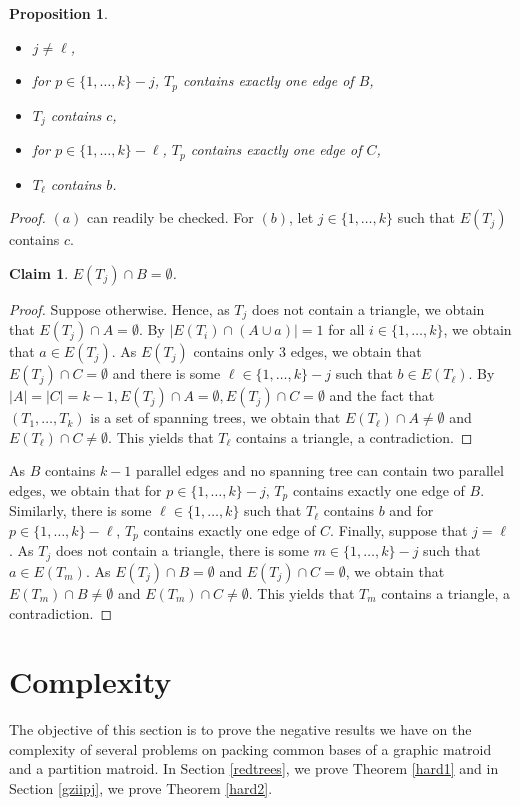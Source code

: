 \documentclass{article}
\newtheorem{Proposition}[Statement]{Proposition}
\newtheorem{Claim}[Statement]{Claim}
\begin{document}
\begin{Proposition}
\begin{enumerate}[(a)]
\end{enumerate} 
\begin{itemize}
\item $j \neq \ell$,
\item for $p \in \{1,\ldots,k\}-j$, $T_p$ contains exactly one edge of $B$,
\item $T_j$ contains $c$,
\item for $p \in \{1,\ldots,k\}-\ell$, $T_p$ contains exactly one edge of $C$,
\item $T_{\ell}$ contains $b$.
\end{itemize}
\end{Proposition}
\begin{proof}
$(a)$ can readily be checked. For $(b)$, let $j \in \{1,\ldots,k\}$ such that $E(T_j)$ contains $c$. 

\begin{Claim}$E(T_j)\cap B= \emptyset$.
\end{Claim}
\begin{proof}Suppose otherwise. Hence, as $T_j$ does not contain a triangle, we obtain that $E(T_j)\cap A= \emptyset$. By $|E(T_i)\cap (A \cup a)|=1$ for all $i \in \{1,\ldots,k\}$, we obtain that $a \in E(T_j)$. As $E(T_j)$ contains only 3 edges, we obtain that $E(T_j)\cap C= \emptyset$ and there is some $\ell \in \{1,\ldots,k\}-j$ such that $b \in E(T_{\ell})$. By $|A|=|C|=k-1, E(T_j)\cap A= \emptyset, E(T_j)\cap C= \emptyset$ and the fact that $(T_1,\ldots,T_k)$ is a set of spanning trees, we obtain that $E(T_{\ell})\cap A \neq \emptyset$ and $E(T_{\ell})\cap C \neq \emptyset$. This yields that $T_{\ell}$ contains a triangle, a contradiction. 
\end{proof}


As $B$ contains $k-1$ parallel edges and no spanning tree can contain two parallel edges, we obtain that  for $p \in \{1,\ldots,k\}-j$, $T_p$ contains exactly one edge of $B$. Similarly, there is some $\ell \in \{1,\ldots,k\}$ such that $T_{\ell}$ contains $b$ and for $p \in \{1,\ldots,k\}-\ell$, $T_p$ contains exactly one edge of $C$. Finally, suppose that $j = \ell$. As $T_j$ does not contain a triangle, there is some $m\in \{1,\ldots,k\}-j$ such that $a \in E(T_m)$. As  $E(T_j)\cap B= \emptyset$ and $E(T_j)\cap C= \emptyset$, we obtain that $E(T_m)\cap B\neq \emptyset$ and $E(T_m)\cap C\neq \emptyset$. This yields that $T_m$ contains a triangle, a contradiction.
\end{proof}
\section{Complexity}\label{complex}
The objective of this section is to prove the negative results we have on the complexity of several problems on packing common bases of a graphic matroid and a partition matroid. In Section \ref{redtrees}, we prove Theorem \ref{hard1} and in Section \ref{gziipj}, we prove Theorem \ref{hard2}.
\end{document}
